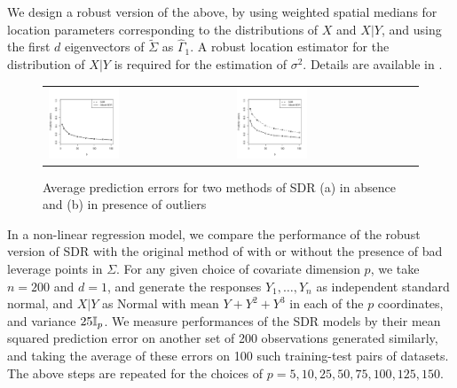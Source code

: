 We design a robust version of the above, by using weighted spatial medians for location 
parameters corresponding to the distributions of $X$ and $X | Y$, and using the first $d$ 
eigenvectors of $\tilde{\Sigma}$ as $\hat\Gamma_{1}$. A robust location estimator for 
the distribution of $X | Y$ is required for the estimation of $\sigma^2$. 
Details are available in \cite{ref:PhilTransRoyalSoc094385_AdragniCook}.
%
\begin{figure}[t!]
\begin{center}
\begin{tabular}{ll}
\includegraphics[width=0.4\textwidth]{SDRcomparison_noout} &
\includegraphics[width=0.4\textwidth]{SDRcomparison_out}
\end{tabular}
\caption{Average prediction errors for two methods of SDR (a) in absence and (b) in presence of outliers}
\label{fig:SDRfig}
\end{center}
\end{figure}
%
In a non-linear regression model, we compare the performance of the robust version of 
SDR with the original method of 
\cite{ref:PhilTransRoyalSoc094385_AdragniCook} 
with or without the presence of bad leverage points in $\Sigma$. 
For any given choice of covariate dimension $p$, we take $n=200$ and $d=1$, 
and generate the responses 
$Y_1, \ldots, Y_n$ as independent standard normal, and 
$X | Y$ as Normal with mean $Y + Y^{2} + Y^3$ in each of the $p$ coordinates, 
and variance $25 {\mathbb{I}}_p$.
We measure performances of the SDR models by their mean squared prediction error on 
another set of 200 observations  generated similarly, and taking the average of these 
errors on 100 such training-test pairs of datasets. The above steps 
are repeated for the choices of $p = 5, 10, 25, 50, 75, 100, 125, 150$.

